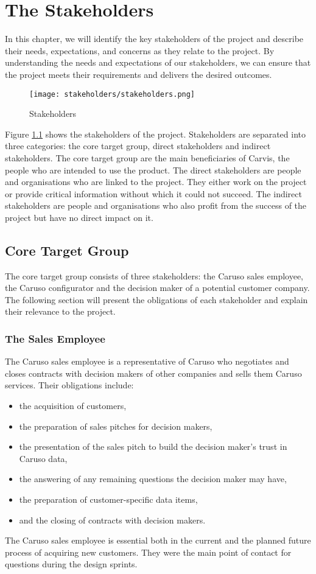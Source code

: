 \chapter{The Stakeholders}
In this chapter, we will identify the key stakeholders of the project and describe their needs, expectations, and concerns as they relate to the project. By understanding the needs and expectations of our stakeholders, we can ensure that the project meets their requirements and delivers the desired outcomes.
\begin{figure}[ht]
  \centering
  \texttt{[image: stakeholders/stakeholders.png]}
  \caption{Stakeholders}
  \label{Kap2:Stakeholders}
\end{figure}
Figure \ref{Kap2:Stakeholders} shows the stakeholders of the project. Stakeholders are separated into three categories: the core target group, direct stakeholders and indirect stakeholders. The core target group are the main beneficiaries of Carvis, the people who are intended to use the product. The direct stakeholders are people and organisations who are linked to the project. They either work on the project or provide critical information without which it could not succeed. The indirect stakeholders are people and organisations who also profit from the success of the project but have no direct impact on it.

\section{Core Target Group}
The core target group consists of three stakeholders: the Caruso sales employee, the Caruso configurator and the decision maker of a potential customer company. The following section will present the obligations of each stakeholder and explain their relevance to the project.

\subsection{The Sales Employee}
The Caruso sales employee is a representative of Caruso who negotiates and closes contracts with decision makers of other companies and sells them Caruso services. Their obligations include:
\begin{itemize}
  \item the acquisition of customers,
  \item the preparation of sales pitches for decision makers,
  \item the presentation of the sales pitch to build the decision maker's trust in Caruso data,
  \item the answering of any remaining questions the decision maker may have,
  \item the preparation of customer-specific data items,
  \item and the closing of contracts with decision makers.
\end{itemize}
The Caruso sales employee is essential both in the current and the planned future process of acquiring new customers. They were the main point of contact for questions during the design sprints.

